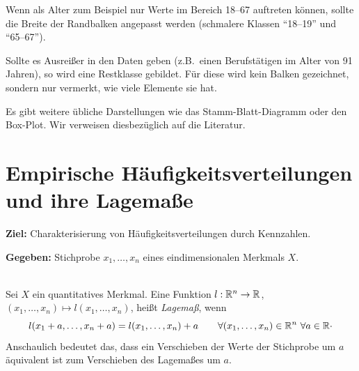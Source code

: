 \begin{bsp}
    Wenn als Alter zum Beispiel nur Werte im Bereich 18--67 auftreten können, sollte die Breite der Randbalken angepasst werden (schmalere Klassen ``18--19'' und ``65--67'').
\end{bsp}

\begin{bem}[Restklasse]
    Sollte es Ausreißer in den Daten geben (z.B.\ einen Berufstätigen im Alter von 91 Jahren), so wird eine Restklasse gebildet.
    Für diese wird kein Balken gezeichnet, sondern nur vermerkt, wie viele Elemente sie hat.
\end{bem}

Es gibt weitere übliche Darstellungen wie das Stamm-Blatt-Diagramm oder den Box-Plot.
Wir verweisen diesbezüglich auf die Literatur.


\section{Empirische Häufigkeitsverteilungen und ihre Lagemaße}\label{sec:empirische-haufigkeitsverteilungen-und-ihre-lagemae}

\noindent \textbf{Ziel:} Charakterisierung von \gls{Häufigkeitsverteilung}en durch Kennzahlen.

\noindent \textbf{Gegeben:} Stichprobe $x_1,\dots,x_n$ eines eindimensionalen \gls{Merkmal}s $X$.

\begin{defi}
    \label{def:lagemaß}   \\
    Sei $X$ ein quantitatives \gls{Merkmal}.
    Eine Funktion $l:\mathbb{R}^n\to\mathbb{R}$, $(x_1,\dots,x_n)\mapsto l(x_1,\dots,x_n)$, heißt \emph{Lagemaß}, wenn
    \[
        l(x_1+a,\dots,x_n+a) = l(x_1,\dots,x_n) + a \qquad \forall (x_1,\dots,x_n)\in\mathbb{R}^n \ \forall a\in\mathbb{R} \cdot
    \]
    Anschaulich bedeutet das, dass ein Verschieben der Werte der Stichprobe um $a$ äquivalent ist zum Verschieben des \gls{Lagemaß}es um $a$.
\end{defi}

